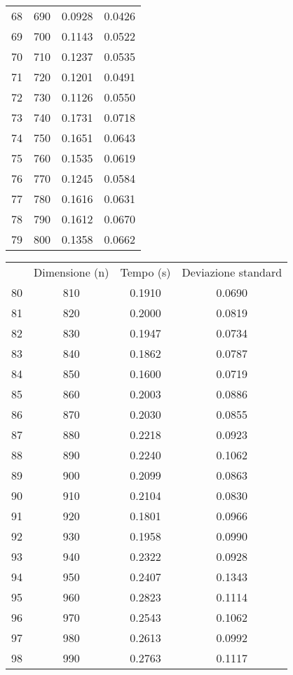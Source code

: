 \begin{table}
\begin{adjustbox}{width=1\textwidth/2}
\begin{tabular}{|c|c|c|c|}
68 & 690 & 0.0928 & 0.0426 \\
\cline{1-4}
69 & 700 & 0.1143 & 0.0522 \\
\cline{1-4}
70 & 710 & 0.1237 & 0.0535 \\
\cline{1-4}
71 & 720 & 0.1201 & 0.0491 \\
\cline{1-4}
72 & 730 & 0.1126 & 0.0550 \\
\cline{1-4}
73 & 740 & 0.1731 & 0.0718 \\
\cline{1-4}
74 & 750 & 0.1651 & 0.0643 \\
\cline{1-4}
75 & 760 & 0.1535 & 0.0619 \\
\cline{1-4}
76 & 770 & 0.1245 & 0.0584 \\
\cline{1-4}
77 & 780 & 0.1616 & 0.0631 \\
\cline{1-4}
78 & 790 & 0.1612 & 0.0670 \\
\cline{1-4}
79 & 800 & 0.1358 & 0.0662 \\
\cline{1-4}
\end{tabular}
\end{adjustbox}
\end{table}

\begin{table}
\centering
\begin{adjustbox}{width=1\textwidth/2}
\begin{tabular}{|c|c|c|c|}
\hline
 & Dimensione (n) & Tempo (s) & Deviazione standard \\
80 & 810 & 0.1910 & 0.0690 \\
\cline{1-4}
81 & 820 & 0.2000 & 0.0819 \\
\cline{1-4}
82 & 830 & 0.1947 & 0.0734 \\
\cline{1-4}
83 & 840 & 0.1862 & 0.0787 \\
\cline{1-4}
84 & 850 & 0.1600 & 0.0719 \\
\cline{1-4}
85 & 860 & 0.2003 & 0.0886 \\
\cline{1-4}
86 & 870 & 0.2030 & 0.0855 \\
\cline{1-4}
87 & 880 & 0.2218 & 0.0923 \\
\cline{1-4}
88 & 890 & 0.2240 & 0.1062 \\
\cline{1-4}
89 & 900 & 0.2099 & 0.0863 \\
\cline{1-4}
90 & 910 & 0.2104 & 0.0830 \\
\cline{1-4}
91 & 920 & 0.1801 & 0.0966 \\
\cline{1-4}
92 & 930 & 0.1958 & 0.0990 \\
\cline{1-4}
93 & 940 & 0.2322 & 0.0928 \\
\cline{1-4}
94 & 950 & 0.2407 & 0.1343 \\
\cline{1-4}
95 & 960 & 0.2823 & 0.1114 \\
\cline{1-4}
96 & 970 & 0.2543 & 0.1062 \\
\cline{1-4}
97 & 980 & 0.2613 & 0.0992 \\
\cline{1-4}
98 & 990 & 0.2763 & 0.1117 \\
\cline{1-4}
\end{tabular}
\end{adjustbox}
\end{table}

